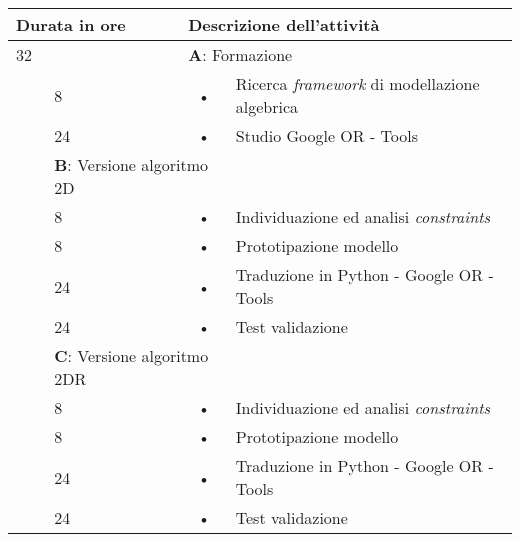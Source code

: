 \begin{center}
	\begin{tabular}{|l|l|c l|}
		\hline
		\multicolumn{2}{|l|}{\textbf{Durata in ore}}		&	\multicolumn{2}{l|}{\textbf{Descrizione dell'attività}}\\
		\hline
		\multicolumn{2}{|l|}{32}	&	\multicolumn{2}{l|}{\textbf{A}: Formazione}  \\
		\hline
		\multirow{5}{1cm}{ } & 8  & \hspace{5mm}•\hspace{2mm} & Ricerca \textit{framework} di modellazione algebrica \\
		\multirow{5}{1cm}{ } & 24 & \hspace{5mm}•\hspace{2mm} & Studio Google OR - Tools                             \\
		\hline
																																					
		\multicolumn{2}{|l|}{64}	&	\multicolumn{2}{l|}{\textbf{B}: Versione algoritmo 2D}   \\
		\hline
		\multirow{5}{1cm}{ } & 8  & \hspace{5mm}•\hspace{2mm} & Individuazione ed analisi \textit{constraints}       \\
		\multirow{3}{1cm}{ } & 8  & \hspace{5mm}•\hspace{2mm} & Prototipazione modello                               \\
		\multirow{5}{1cm}{ } & 24 & \hspace{5mm}•\hspace{2mm} & Traduzione in Python - Google OR - Tools             \\
		\multirow{5}{1cm}{ } & 24 & \hspace{5mm}•\hspace{2mm} & Test validazione                                     \\	
		\hline
																																					
		\multicolumn{2}{|l|}{64}	&	\multicolumn{2}{l|}{\textbf{C}: Versione algoritmo 2DR}  \\
		\hline
		\multirow{5}{1cm}{ } & 8  & \hspace{5mm}•\hspace{2mm} & Individuazione ed analisi \textit{constraints}       \\
		\multirow{3}{1cm}{ } & 8  & \hspace{5mm}•\hspace{2mm} & Prototipazione modello                               \\
		\multirow{5}{1cm}{ } & 24 & \hspace{5mm}•\hspace{2mm} & Traduzione in Python - Google OR - Tools             \\
		\multirow{5}{1cm}{ } & 24 & \hspace{5mm}•\hspace{2mm} & Test validazione                                     \\	
		\hline
																		

\end{tabular}
\end{center}
